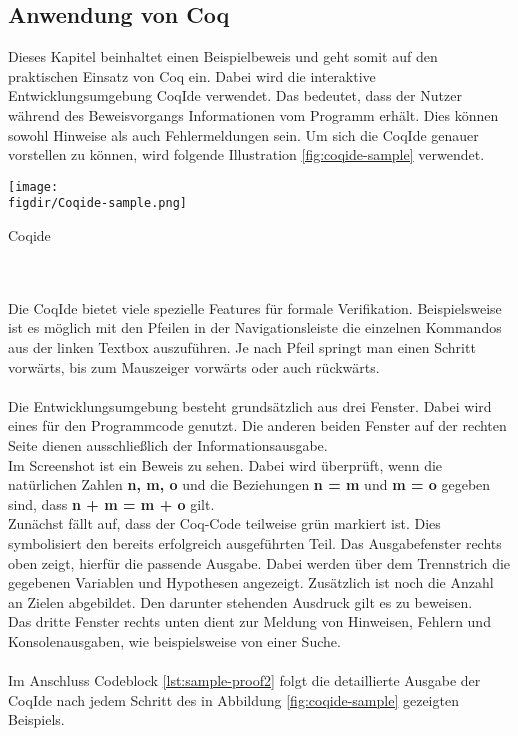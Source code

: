 \subsection{Anwendung von Coq}
Dieses Kapitel beinhaltet einen Beispielbeweis und geht somit auf den praktischen Einsatz von Coq ein. Dabei wird die interaktive Entwicklungsumgebung CoqIde verwendet. Das bedeutet, dass der Nutzer während des Beweisvorgangs Informationen vom Programm erhält. Dies können sowohl Hinweise als auch Fehlermeldungen sein. Um sich die CoqIde genauer vorstellen zu können, wird folgende Illustration \ref{fig:coqide-sample} verwendet.\\

\begin{minipage}{\textwidth}
	\centering
	\captionsetup{type=figure}
	\texttt{[image: \\figdir/Coqide-sample.png]}
	\caption{Coqide}
	\label{fig:coqide-sample}
\end{minipage}
\\
\\
Die CoqIde bietet viele spezielle Features für formale Verifikation. Beispielsweise ist es möglich mit den Pfeilen in der Navigationsleiste die einzelnen Kommandos aus der linken Textbox auszuführen. Je nach Pfeil springt man einen Schritt vorwärts, bis zum Mauszeiger vorwärts oder auch rückwärts.\\
\\
Die Entwicklungsumgebung besteht grundsätzlich aus drei Fenster. Dabei wird eines für den Programmcode genutzt. Die anderen beiden Fenster auf der rechten Seite dienen ausschließlich der Informationsausgabe.\\
Im Screenshot ist ein Beweis zu sehen. Dabei wird überprüft, wenn die natürlichen Zahlen \textbf{n, m, o} und die Beziehungen \textbf{n = m} und \textbf{m = o} gegeben sind, dass \textbf{n + m = m + o} gilt.\\
Zunächst fällt auf, dass der Coq-Code teilweise grün markiert ist. Dies symbolisiert den bereits erfolgreich ausgeführten Teil. Das Ausgabefenster rechts oben zeigt, hierfür die passende Ausgabe. Dabei werden über dem Trennstrich die gegebenen Variablen und Hypothesen angezeigt. Zusätzlich ist noch die Anzahl an Zielen abgebildet. Den darunter stehenden Ausdruck gilt es zu beweisen.\\
Das dritte Fenster rechts unten dient zur Meldung von Hinweisen, Fehlern und Konsolenausgaben, wie beispielsweise von einer Suche.\\
\\
Im Anschluss  Codeblock \ref{lst:sample-proof2} folgt die detaillierte Ausgabe der CoqIde nach jedem Schritt des in Abbildung \ref{fig:coqide-sample} gezeigten Beispiels.
